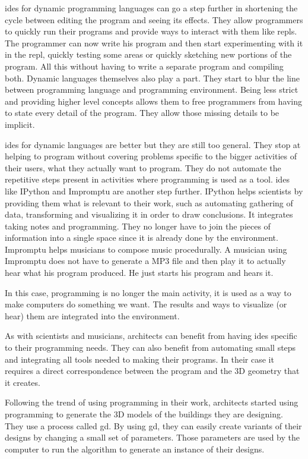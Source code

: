 \documentclass{./llncs2e/llncs}
\begin{document}
	\ac{ide}s for dynamic programming languages can go a step further in shortening the cycle between editing the program and seeing its effects.
	They allow programmers to quickly run their programs and provide ways to interact with them like \ac{repl}s.
	The programmer can now write his program and then start experimenting with it in the \ac{repl}, quickly testing some areas or quickly sketching new portions of the program.
	All this without having to write a separate program and compiling both.
	Dynamic languages themselves also play a part.
	They start to blur the line between programming language and programming environment.
	Being less strict and providing higher level concepts allows them to free programmers from having to state every detail of the program.
	They allow those missing details to be implicit.

	\ac{ide}s for dynamic languages are better but they are still too general.
	They stop at helping to program without covering problems specific to the bigger activities of their users, what they actually want to program.
	They do not automate the repetitive steps present in activities where programming is used as a tool.
	\ac{ide}s like IPython and Impromptu are another step further.
	IPython helps scientists by providing them what is relevant to their work, such as automating gathering of data, transforming and visualizing it in order to draw conclusions.
	It integrates taking notes and programming.
	They no longer have to join the pieces of information into a single space since it is already done by the environment.
	Impromptu helps musicians to compose music procedurally.
	A musician using Impromptu does not have to generate a MP3 file and then play it to actually hear what his program produced.
	He just starts his program and hears it.

	In this case, programming is no longer the main activity, it is used as a way to make computers do something we want.
	The results and ways to visualize (or hear) them are integrated into the environment.

	As with scientists and musicians, architects can benefit from having \ac{ide}s specific to their programming needs.
	They can also benefit from automating small steps and integrating all tools needed to making their programs.
	In their case it requires a direct correspondence between the program and the 3D geometry that it creates.
	
	Following the trend of using programming in their work, architects started using programming to generate the 3D models of the buildings they are designing. 
	They use a process called \ac{gd}\cite{terzidis2003expressive,Maeda:2001:DN:559503}.
	By using \ac{gd}, they can easily create variants of their designs by changing a small set of parameters. 
	Those parameters are used by the computer to run the algorithm to generate an instance of their designs\cite{Santos20144}. 
\end{document}
